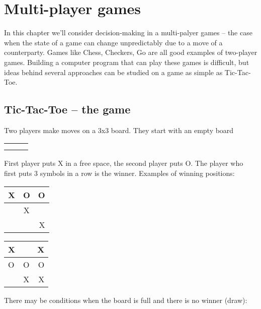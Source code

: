\chapter{Multi-player games}

In this chapter we'll consider decision-making in a multi-palyer
games -- the case when the state of a game can change unpredictably
due to a move of a counterparty. Games like Chess, Checkers, Go
are all good examples of two-player games. Building a computer
program that can play these games is difficult, but ideas behind
several approaches can be studied on a game as simple as Tic-Tac-Toe.

\section{Tic-Tac-Toe -- the game}

Two players make moves on a 3x3 board. They start with an empty board

\begin{center}
\begin{tabular}{ l | c | r }
     &  &  \\ \hline
     &  &  \\ \hline
     &  &  \\
  \end{tabular}
\end{center}
First player puts X in a free space,
the second player puts O. The player who first puts 3 symbols in a row is
the winner. Examples of winning positions:

\begin{center}
\begin{tabular}{ l | c | r }
    X & O & O \\ \hline
     & X &  \\ \hline
     &  & X  \\
  \end{tabular}
\end{center}

\begin{center}
\begin{tabular}{ l | c | r }
    X &  & X \\ \hline
    O & O & O \\ \hline
      & X & X  \\
  \end{tabular}
\end{center}

There may be conditions when the board is full and there is no winner (draw):


